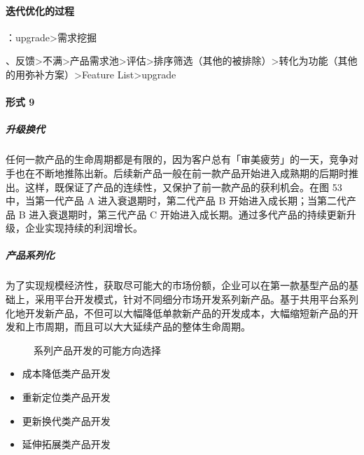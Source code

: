 \documentclass[letterpaper,10pt,english]{sphinxmanual}
\begin{document}
\paragraph{迭代优化的过程}
\label{\detokenize{chapter_knowledge/upgrade_manage:id4}}
：upgrade\sphinxhyphen{}>需求挖掘%
\begin{footnote}[671]\sphinxAtStartFootnote
{}
%
\end{footnote}、反馈\sphinxhyphen{}>不满\sphinxhyphen{}>产品需求池\sphinxhyphen{}>评估\sphinxhyphen{}>排序筛选（其他的被排除）\sphinxhyphen{}>转化为功能（其他的用弥补方案）\sphinxhyphen{}>Feature
List\sphinxhyphen{}>upgrade


\paragraph{形式 9\sphinxfootnotemark[672]}
\label{\detokenize{chapter_knowledge/upgrade_manage:id5}}%
\begin{footnotetext}[672]\sphinxAtStartFootnote
{}
%
\end{footnotetext}\ignorespaces 

\subparagraph{升级换代}
\label{\detokenize{chapter_knowledge/upgrade_manage:id6}}
任何一款产品的生命周期都是有限的，因为客户总有「审美疲劳」的一天，竞争对手也在不断地推陈出新。后续新产品一般在前一款产品开始进入成熟期的后期时推出。这样，既保证了产品的连续性，又保护了前一款产品的获利机会。在图
5\sphinxhyphen{}3 中，当第一代产品 A 进入衰退期时，第二代产品 B
开始进入成长期；当第二代产品 B 进入衰退期时，第三代产品 C
开始进入成长期。通过多代产品的持续更新升级，企业实现持续的利润增长。


\subparagraph{产品系列化}
\label{\detokenize{chapter_knowledge/upgrade_manage:id7}}
为了实现规模经济性，获取尽可能大的市场份额，企业可以在第一款基型产品的基础上，采用平台开发模式，针对不同细分市场开发系列新产品。基于共用平台系列化地开发新产品，不但可以大幅降低单款新产品的开发成本，大幅缩短新产品的开发和上市周期，而且可以大大延续产品的整体生命周期。

\begin{figure}[H]
\centering
\capstart

\noindent{}
\caption{系列产品开发的可能方向选择}\label{\detokenize{chapter_knowledge/upgrade_manage:id22}}\end{figure}
\begin{itemize}
\item {} 
成本降低类产品开发

\item {} 
重新定位类产品开发

\item {} 
更新换代类产品开发

\item {} 
延伸拓展类产品开发

\end{itemize}
\end{document}
